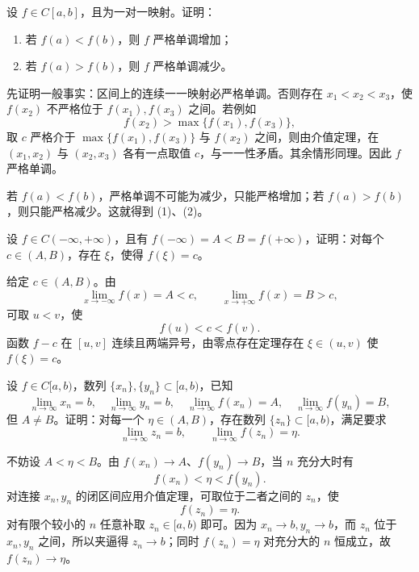 \begin{xexercise}[8]
设 $f\in C[a,b]$，且为一对一映射。证明：
  \begin{enumerate}[label=(\arabic*)]
    \item 若 $f(a)<f(b)$，则 $f$ 严格单调增加；
    \item 若 $f(a)>f(b)$，则 $f$ 严格单调减少。
  \end{enumerate}
\end{xexercise}
\begin{xsolution}
先证明一般事实：区间上的连续一一映射必严格单调。否则存在 $x_1<x_2<x_3$，使 $f(x_2)$ 不严格位于 $f(x_1),f(x_3)$ 之间。若例如
\[
 f(x_2)>\max\{f(x_1),f(x_3)\},
\]
取 $c$ 严格介于 $\max\{f(x_1),f(x_3)\}$ 与 $f(x_2)$ 之间，则由介值定理，在 $(x_1,x_2)$ 与 $(x_2,x_3)$ 各有一点取值 $c$，与一一性矛盾。其余情形同理。因此 $f$ 严格单调。

若 $f(a)<f(b)$，严格单调不可能为减少，只能严格增加；若 $f(a)>f(b)$，则只能严格减少。这就得到 (1)、(2)。
\end{xsolution}


\begin{xexercise}[9]
设 $f\in C(-\infty,+\infty)$，且有 $f(-\infty)=A<B=f(+\infty)$，证明：对每个 $c\in(A,B)$，存在 $\xi$，使得 $f(\xi)=c$。
\end{xexercise}
\begin{xsolution}
给定 $c\in(A,B)$。由
\[
 \lim_{x\to-\infty}f(x)=A<c,
 \qquad
 \lim_{x\to+\infty}f(x)=B>c,
\]
可取 $u<v$，使
\[
 f(u)<c<f(v).
\]
函数 $f-c$ 在 $[u,v]$ 连续且两端异号，由零点存在定理存在 $\xi\in(u,v)$ 使 $f(\xi)=c$。
\end{xsolution}


\begin{xexercise}[10]
设 $f\in C[a,b)$，数列 $\{x_n\},\{y_n\}\subset[a,b)$，已知
  \[
    \lim_{n\to\infty}x_n=b,\quad \lim_{n\to\infty}y_n=b,\quad
    \lim_{n\to\infty}f(x_n)=A,\quad \lim_{n\to\infty}f(y_n)=B,
  \]
  但 $A\ne B$。证明：对每一个 $\eta\in(A,B)$，存在数列 $\{z_n\}\subset[a,b)$，满足要求
  \[
    \lim_{n\to\infty}z_n=b,\qquad \lim_{n\to\infty}f(z_n)=\eta.
  \]
\end{xexercise}
\begin{xsolution}
不妨设 $A<\eta<B$。由 $f(x_n)\to A$、$f(y_n)\to B$，当 $n$ 充分大时有
\[
 f(x_n)<\eta<f(y_n).
\]
对连接 $x_n,y_n$ 的闭区间应用介值定理，可取位于二者之间的 $z_n$，使
\[
 f(z_n)=\eta.
\]
对有限个较小的 $n$ 任意补取 $z_n\in[a,b)$ 即可。因为 $x_n\to b,y_n\to b$，而 $z_n$ 位于 $x_n,y_n$ 之间，所以夹逼得 $z_n\to b$；同时 $f(z_n)=\eta$ 对充分大的 $n$ 恒成立，故 $f(z_n)\to\eta$。
\end{xsolution}


